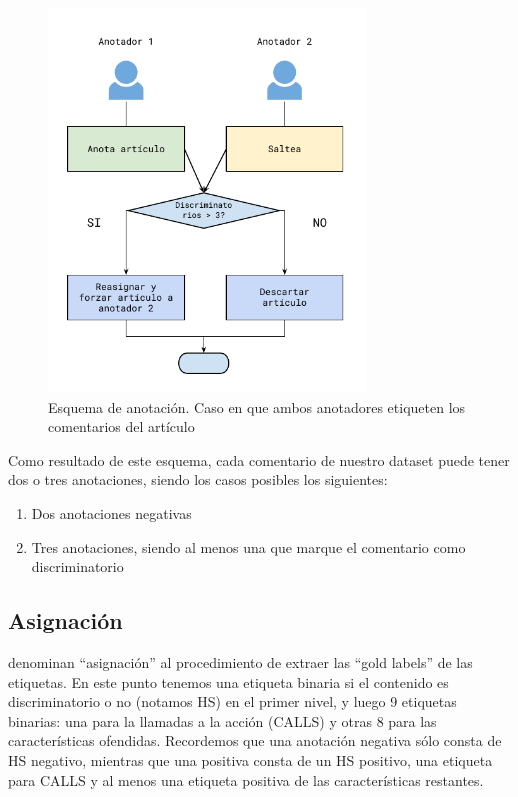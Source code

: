 \begin{figure}
    \centering
    \includegraphics[width=0.75\textwidth]{img/esquema_anotacion_caso_2.pdf}
    \caption{Esquema de anotación. Caso en que ambos anotadores etiqueten los comentarios del artículo}
    \label{fig:annotation_schema_case_two}
\end{figure}


Como resultado de este esquema, cada comentario de nuestro dataset puede tener dos o tres anotaciones, siendo los casos posibles los siguientes:

\begin{enumerate}
    \item Dos anotaciones negativas
    \item Tres anotaciones, siendo al menos una que marque el comentario como discriminatorio
\end{enumerate}




\subsection{Asignación}

\citet{pustejovsky2012natural} denominan ``asignación'' al procedimiento de extraer las ``gold labels'' de las etiquetas. En este punto tenemos una etiqueta binaria si el contenido es discriminatorio o no (notamos HS) en el primer nivel, y luego 9 etiquetas binarias: una para la llamadas a la acción (CALLS) y otras 8 para las características ofendidas. Recordemos que una anotación negativa sólo consta de HS negativo, mientras que una positiva consta de un HS positivo, una etiqueta para CALLS y al menos una etiqueta positiva de las características restantes.

